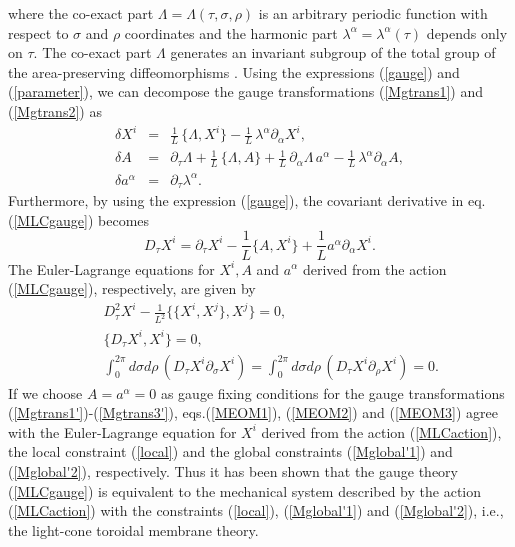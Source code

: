 \documentclass[12pt,a4paper]{article}
\newcommand{\ptau}{\partial_\tau}
\newcommand{\psig}{\partial_\sigma}
\newcommand{\prho}{\partial_\rho}
\newcommand{\p}{\partial}
\begin{document}
where the co-exact part $\Lambda=\Lambda(\tau,\sigma,\rho)$ is an
arbitrary periodic function with respect to $\sigma$ and $\rho$
coordinates and the harmonic part
$\lambda^{\alpha}=\lambda^{\alpha}(\tau)$ depends only on $\tau$.
The co-exact part $\Lambda$ generates an invariant subgroup
of the total group of the area-preserving diffeomorphisms \cite{dWMN}.
Using the expressions (\ref{gauge}) and (\ref{parameter}),
we can decompose the gauge transformations (\ref{Mgtrans1})
and (\ref{Mgtrans2}) as
\begin{eqnarray}
  \delta X^i&=&\frac{1}{L}\,\{\Lambda,X^i\}-\frac{1}{L}\,
	\lambda^{\alpha}\p_{\alpha}X^i,\label{Mgtrans1'}\\
  \delta A~ &=&\ptau \Lambda +\frac{1}{L}\,\{\Lambda,A\}
    +\frac{1}{L}\,\p_{\alpha}\Lambda\, a^{\alpha}
    -\frac{1}{L}\,\lambda^{\alpha}\p_{\alpha}A,\label{Mgtrans2'}\\
  \delta a^{\alpha}&=&\ptau\lambda^{\alpha}.\label{Mgtrans3'}
\end{eqnarray}
Furthermore, by using the expression (\ref{gauge}),
the covariant derivative in eq.(\ref{MLCgauge}) becomes
\begin{equation}
  D_{\tau}X^i=\ptau X^i -\frac{1}{L}\{A,X^i\}
	+\frac{1}{L}a^{\alpha}\p_{\alpha}X^i.\label{CD2}
\end{equation}
The Euler-Lagrange equations for $X^i, A$ and $a^{\alpha}$ derived
from the action (\ref{MLCgauge}), respectively, are given by
\begin{eqnarray}
  &&D_{\tau}^2X^i - \frac{1}{L^2}\{\{X^i,X^j\},X^j\}=0,\label{MEOM1}\\
  &&\{D_{\tau} X^i,X^i\}=0,\label{MEOM2}\\
  &&\int_0^{2\pi} d\sigma d\rho\,(D_{\tau} X^i\psig X^i)=\int_0^{2\pi}
	d\sigma d\rho\,(D_{\tau} X^i\prho X^i)=0.\label{MEOM3}
\end{eqnarray}
If we choose  $A=a^{\alpha}=0$ as gauge fixing conditions for the
gauge transformations (\ref{Mgtrans1'})-(\ref{Mgtrans3'}),
eqs.(\ref{MEOM1}), (\ref{MEOM2}) and (\ref{MEOM3}) agree with the
Euler-Lagrange equation for $X^i$ derived from the action
(\ref{MLCaction}), the local constraint (\ref{local}) and
the global constraints (\ref{Mglobal'1}) and (\ref{Mglobal'2}),
respectively. Thus it has been shown that the gauge theory
(\ref{MLCgauge}) is equivalent to the mechanical system described by
the action (\ref{MLCaction}) with the constraints (\ref{local}),
(\ref{Mglobal'1}) and (\ref{Mglobal'2}), i.e., the light-cone
toroidal membrane theory.
\end{document}
